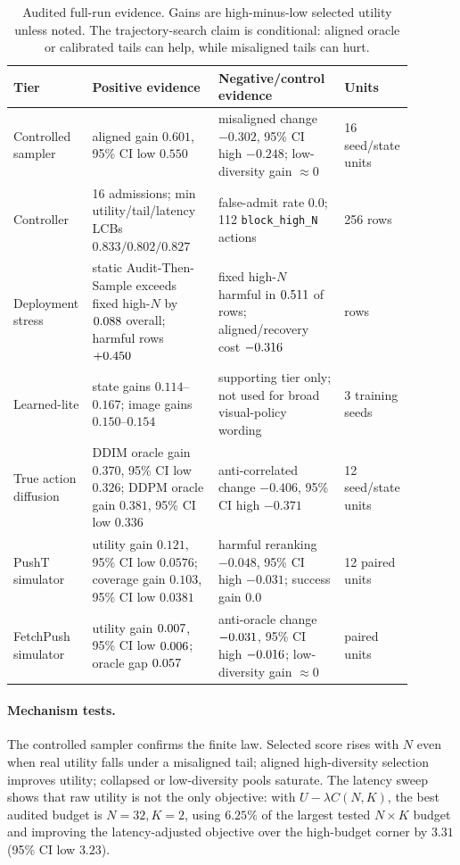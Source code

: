 \documentclass{article}
\newcommand{\ats}{Audit-Then-Sample}
\newcommand{\ci}{95\% CI}
\newcommand{\lcb}{LCB}
\begin{document}
\begin{table}[t]
\caption{Audited full-run evidence. Gains are high-minus-low selected utility unless noted. The trajectory-search claim is conditional: aligned oracle or calibrated tails can help, while misaligned tails can hurt.}
\label{tab:main-evidence}
\centering
\footnotesize
\begin{tabular}{@{}p{0.16\linewidth}p{0.31\linewidth}p{0.31\linewidth}p{0.11\linewidth}@{}}
\toprule
Tier & Positive evidence & Negative/control evidence & Units \\
\midrule
Controlled sampler & aligned gain $0.601$, \ci{} low $0.550$ & misaligned change $-0.302$, \ci{} high $-0.248$; low-diversity gain $\approx 0$ & 16 seed/state units \\
Controller & 16 admissions; min utility/tail/latency \lcb{}s $0.833/0.802/0.827$ & false-admit rate $0.0$; 112 \texttt{block\_high\_N} actions & 256 rows \\
Deployment stress & static \ats{} exceeds fixed high-$N$ by $0.088$ overall; harmful rows $+0.450$ & fixed high-$N$ harmful in $0.511$ of rows; aligned/recovery cost $-0.316$ & \AtsDeployStressRows{} rows \\
Learned-lite & state gains $0.114$--$0.167$; image gains $0.150$--$0.154$ & supporting tier only; not used for broad visual-policy wording & 3 training seeds \\
True action diffusion & DDIM oracle gain $0.370$, \ci{} low $0.326$; DDPM oracle gain $0.381$, \ci{} low $0.336$ & anti-correlated change $-0.406$, \ci{} high $-0.371$ & 12 seed/state units \\
PushT simulator & utility gain $0.121$, \ci{} low $0.0576$; coverage gain $0.103$, \ci{} low $0.0381$ & harmful reranking $-0.048$, \ci{} high $-0.031$; success gain $0.0$ & 12 paired units \\
FetchPush simulator & utility gain $0.007$, \ci{} low $0.006$; oracle gap $0.057$ & anti-oracle change $-0.031$, \ci{} high $-0.016$; low-diversity gain $\approx 0$ & \AtsFetchBenchmarkUnits{} paired units \\
\bottomrule
\end{tabular}
\end{table}

\paragraph{Mechanism tests.}
The controlled sampler confirms the finite law. Selected score rises with $N$ even when real utility falls under a misaligned tail; aligned high-diversity selection improves utility; collapsed or low-diversity pools saturate. The latency sweep shows that raw utility is not the only objective: with $U-\lambda C(N,K)$, the best audited budget is $N=32,K=2$, using $6.25\%$ of the largest tested $N{\times}K$ budget and improving the latency-adjusted objective over the high-budget corner by $3.31$ (\ci{} low $3.23$).
\end{document}
